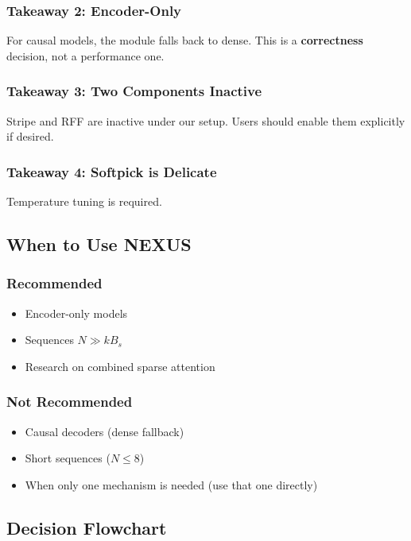 \subsubsection{Takeaway 2: Encoder-Only}

For causal models, the module falls back to dense. This is a \textbf{correctness} 
decision, not a performance one.

\subsubsection{Takeaway 3: Two Components Inactive}

Stripe and RFF are inactive under our setup. Users should enable them 
explicitly if desired.

\subsubsection{Takeaway 4: Softpick is Delicate}

Temperature tuning is required.

\subsection{When to Use NEXUS}

\subsubsection{Recommended}
\begin{itemize}
\item Encoder-only models
\item Sequences $N \gg k B_s$
\item Research on combined sparse attention

\end{itemize}
\subsubsection{Not Recommended}
\begin{itemize}
\item Causal decoders (dense fallback)
\item Short sequences ($N \leq 8$)
\item When only one mechanism is needed (use that one directly)

\end{itemize}
\subsection{Decision Flowchart}

